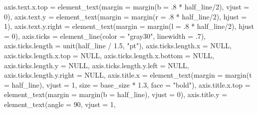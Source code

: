 \documentclass[
  letterpaper,
]{scrbook}
\newenvironment{Shaded}{\begin{snugshade}}{\end{snugshade}}
\newcommand{\AttributeTok}[1]{\textcolor[rgb]{0.40,0.45,0.13}{#1}}
\newcommand{\ConstantTok}[1]{\textcolor[rgb]{0.56,0.35,0.01}{#1}}
\newcommand{\DecValTok}[1]{\textcolor[rgb]{0.68,0.00,0.00}{#1}}
\newcommand{\FloatTok}[1]{\textcolor[rgb]{0.68,0.00,0.00}{#1}}
\newcommand{\FunctionTok}[1]{\textcolor[rgb]{0.28,0.35,0.67}{#1}}
\newcommand{\NormalTok}[1]{\textcolor[rgb]{0.00,0.23,0.31}{#1}}
\newcommand{\SpecialCharTok}[1]{\textcolor[rgb]{0.37,0.37,0.37}{#1}}
\newcommand{\StringTok}[1]{\textcolor[rgb]{0.13,0.47,0.30}{#1}}
\begin{document}
\begin{Shaded}
\begin{Highlighting}[]
    \AttributeTok{axis.text.x.top =} \FunctionTok{element\_text}\NormalTok{(}\AttributeTok{margin =} \FunctionTok{margin}\NormalTok{(}\AttributeTok{b =}\NormalTok{ .}\DecValTok{8} \SpecialCharTok{*}\NormalTok{ half\_line}\SpecialCharTok{/}\DecValTok{2}\NormalTok{),}
                                   \AttributeTok{vjust =} \DecValTok{0}\NormalTok{),}
    \AttributeTok{axis.text.y =} \FunctionTok{element\_text}\NormalTok{(}\AttributeTok{margin =} \FunctionTok{margin}\NormalTok{(}\AttributeTok{r =}\NormalTok{ .}\DecValTok{8} \SpecialCharTok{*}\NormalTok{ half\_line}\SpecialCharTok{/}\DecValTok{2}\NormalTok{),}
                               \AttributeTok{hjust =} \DecValTok{1}\NormalTok{),}
    \AttributeTok{axis.text.y.right =} \FunctionTok{element\_text}\NormalTok{(}\AttributeTok{margin =} \FunctionTok{margin}\NormalTok{(}\AttributeTok{l =}\NormalTok{ .}\DecValTok{8} \SpecialCharTok{*}\NormalTok{ half\_line}\SpecialCharTok{/}\DecValTok{2}\NormalTok{),}
                                     \AttributeTok{hjust =} \DecValTok{0}\NormalTok{),}
    \AttributeTok{axis.ticks =} \FunctionTok{element\_line}\NormalTok{(}\AttributeTok{color =} \StringTok{"gray30"}\NormalTok{, }\AttributeTok{linewidth =}\NormalTok{ .}\DecValTok{7}\NormalTok{),}
    \AttributeTok{axis.ticks.length =} \FunctionTok{unit}\NormalTok{(half\_line }\SpecialCharTok{/} \FloatTok{1.5}\NormalTok{, }\StringTok{"pt"}\NormalTok{),}
    \AttributeTok{axis.ticks.length.x =} \ConstantTok{NULL}\NormalTok{,}
    \AttributeTok{axis.ticks.length.x.top =} \ConstantTok{NULL}\NormalTok{,}
    \AttributeTok{axis.ticks.length.x.bottom =} \ConstantTok{NULL}\NormalTok{,}
    \AttributeTok{axis.ticks.length.y =} \ConstantTok{NULL}\NormalTok{,}
    \AttributeTok{axis.ticks.length.y.left =} \ConstantTok{NULL}\NormalTok{,}
    \AttributeTok{axis.ticks.length.y.right =} \ConstantTok{NULL}\NormalTok{,}
    \AttributeTok{axis.title.x =} \FunctionTok{element\_text}\NormalTok{(}\AttributeTok{margin =} \FunctionTok{margin}\NormalTok{(}\AttributeTok{t =}\NormalTok{ half\_line),}
                                \AttributeTok{vjust =} \DecValTok{1}\NormalTok{, }\AttributeTok{size =}\NormalTok{ base\_size }\SpecialCharTok{*} \FloatTok{1.3}\NormalTok{,}
                                \AttributeTok{face =} \StringTok{"bold"}\NormalTok{),}
    \AttributeTok{axis.title.x.top =} \FunctionTok{element\_text}\NormalTok{(}\AttributeTok{margin =} \FunctionTok{margin}\NormalTok{(}\AttributeTok{b =}\NormalTok{ half\_line),}
                                    \AttributeTok{vjust =} \DecValTok{0}\NormalTok{),}
    \AttributeTok{axis.title.y =} \FunctionTok{element\_text}\NormalTok{(}\AttributeTok{angle =} \DecValTok{90}\NormalTok{, }\AttributeTok{vjust =} \DecValTok{1}\NormalTok{,}

\end{Highlighting}
\end{Shaded}
\end{document}
